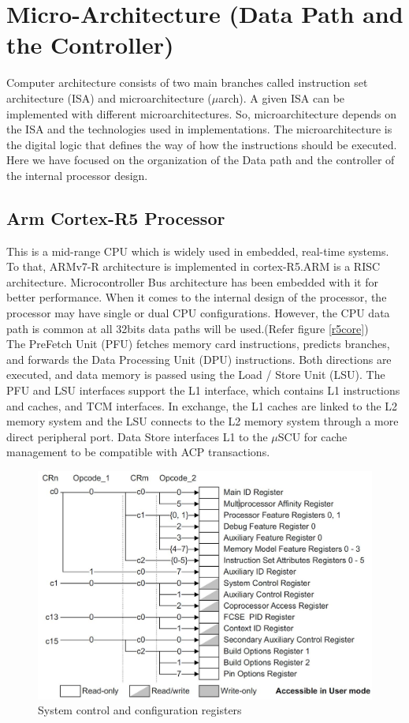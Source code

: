 \documentclass[a4paper,11pt]{article}
\begin{document}
\section{Micro-Architecture (Data Path and the Controller)}
Computer architecture consists of two main branches called instruction set architecture (ISA) and microarchitecture ($\mu$arch). A given ISA can be implemented with different microarchitectures. So, microarchitecture depends on the ISA and the technologies used in implementations. The microarchitecture is the digital logic that defines the way of how the instructions should be executed. Here we have focused on the organization of the Data path and the controller of the internal processor design\cite{pcmag}.
\subsection{Arm Cortex-R5 Processor}
This is a mid-range CPU which is widely used in embedded, real-time systems. To that, ARMv7-R architecture is implemented in cortex-R5.ARM is a RISC architecture. Microcontroller Bus architecture has been embedded with it for better performance. When it comes to the internal design of the processor, the processor may have single or dual CPU configurations. However, the CPU data path is common at all 32bits data paths will be used\cite{TCLS}.(Refer figure \ref{r5core}) \\

The PreFetch Unit (PFU) fetches memory card instructions, predicts branches, and forwards the Data Processing Unit (DPU) instructions. Both directions are executed, and data memory is passed using the Load / Store Unit (LSU). The PFU and LSU interfaces support the L1 interface, which contains L1 instructions and caches, and TCM interfaces. In exchange, the L1 caches are linked to the L2 memory system and the LSU connects to the L2 memory system through a more direct peripheral port. Data Store interfaces L1 to the $\mu$SCU\cite{developer} for cache management to be compatible with ACP transactions.\\

\begin{figure}[!h]
	\centering
	\includegraphics[scale= 0.3]{figures/syscc}
	\caption{System control and configuration registers}
\end{figure}
\end{document}
